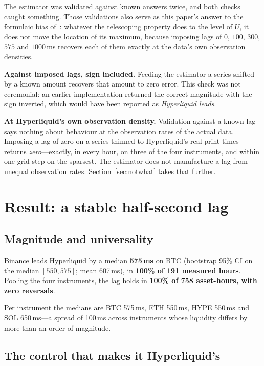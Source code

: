 \documentclass[11pt,a4paper]{article}
\begin{document}
The estimator was validated against known answers twice, and both checks caught something. Those
validations also serve as this paper's answer to the formulaic bias of~\cite{georgiadis2024}:
whatever the telescoping property does to the level of $U$, it does not move the location of its
maximum, because imposing lags of $0$, $100$, $300$, $575$ and $1000$\,ms recovers each of them
exactly at the data's own observation densities.

\textbf{Against imposed lags, sign included.} Feeding the estimator a series shifted by a known
amount recovers that amount to zero error. This check was not ceremonial: an earlier
implementation returned the correct magnitude with the sign inverted, which would have been
reported as \emph{Hyperliquid leads}.

\textbf{At Hyperliquid's own observation density.} Validation against a known lag says nothing
about behaviour at the observation rates of the actual data. Imposing a lag of zero on a series
thinned to Hyperliquid's real print times returns \emph{zero}---exactly, in every hour, on three
of the four instruments, and within one grid step on the sparsest. The estimator does not
manufacture a lag from unequal observation rates. Section~\ref{sec:notwhat} takes that further.

\section{Result: a stable half-second lag}

\subsection{Magnitude and universality}

Binance leads Hyperliquid by a median \textbf{575\,ms} on BTC (bootstrap 95\% CI on the median
$[550, 575]$; mean 607\,ms), in \textbf{100\% of 191 measured hours}. Pooling the four
instruments, the lag holds in \textbf{100\% of 758 asset-hours, with zero reversals}.

Per instrument the medians are BTC 575\,ms, ETH 550\,ms, HYPE 550\,ms and SOL 650\,ms---a spread
of 100\,ms across instruments whose liquidity differs by more than an order of magnitude.

\subsection{The control that makes it Hyperliquid's}
\label{sec:control}
\end{document}
